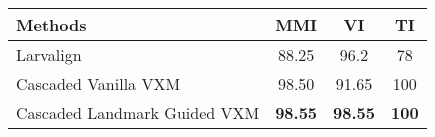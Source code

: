 \begin{tabular}{lccc}
\hline
 ﻿Methods  & MMI   & VI    & TI  \\ \hline \hline
 Larvalign & 88.25 & 96.2  & 78  \\
 Cascaded Vanilla VXM  & 98.50 & 91.65 & 100 \\
 Cascaded Landmark Guided VXM  & \textbf{98.55} & \textbf{98.55} & \textbf{100} \\
\hline
\end{tabular}